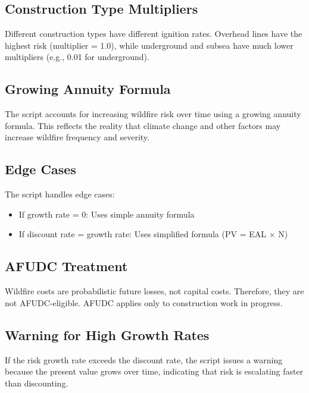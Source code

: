 \documentclass[ctcc_full_documentation.tex]{subfiles}
\begin{document}
\subsection{Construction Type Multipliers}

Different construction types have different ignition rates. Overhead lines have the highest risk (multiplier = 1.0), while underground and subsea have much lower multipliers (e.g., 0.01 for underground).

\subsection{Growing Annuity Formula}

The script accounts for increasing wildfire risk over time using a growing annuity formula. This reflects the reality that climate change and other factors may increase wildfire frequency and severity.

\subsection{Edge Cases}

The script handles edge cases:
\begin{itemize}
    \item If growth rate = 0: Uses simple annuity formula
    \item If discount rate = growth rate: Uses simplified formula (PV = EAL × N)
\end{itemize}

\subsection{AFUDC Treatment}

Wildfire costs are probabilistic future losses, not capital costs. Therefore, they are not AFUDC-eligible. AFUDC applies only to construction work in progress.

\subsection{Warning for High Growth Rates}

If the risk growth rate exceeds the discount rate, the script issues a warning because the present value grows over time, indicating that risk is escalating faster than discounting.
\end{document}
